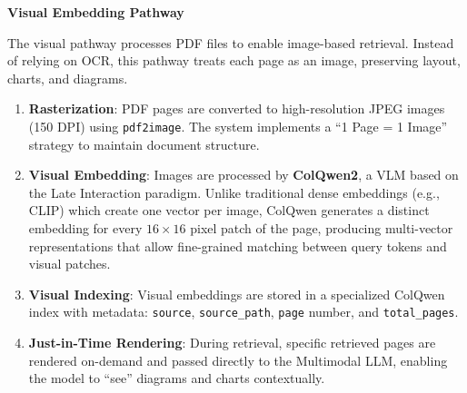 \begin{table}[H]
\centering
\caption{Text embedding and indexing pipeline stages.}
\label{tab:text_indexing}
\end{table}

\textbf{Visual Embedding Pathway}

The visual pathway processes PDF files to enable image-based retrieval. Instead of relying on OCR, this pathway treats each page as an image, preserving layout, charts, and diagrams.

\begin{enumerate}
    \item \textbf{Rasterization}: PDF pages are converted to high-resolution JPEG images (150 DPI) using \texttt{pdf2image}. The system implements a ``1 Page = 1 Image'' strategy to maintain document structure.
    
    \item \textbf{Visual Embedding}: Images are processed by \textbf{ColQwen2}, a VLM based on the Late Interaction paradigm. Unlike traditional dense embeddings (e.g., CLIP) which create one vector per image, ColQwen generates a distinct embedding for every $16 \times 16$ pixel patch of the page, producing multi-vector representations that allow fine-grained matching between query tokens and visual patches.
    
    \item \textbf{Visual Indexing}: Visual embeddings are stored in a specialized ColQwen index with metadata: \texttt{source}, \texttt{source\_path}, \texttt{page} number, and \texttt{total\_pages}.
    
    \item \textbf{Just-in-Time Rendering}: During retrieval, specific retrieved pages are rendered on-demand and passed directly to the Multimodal LLM, enabling the model to ``see'' diagrams and charts contextually.
\end{enumerate}

